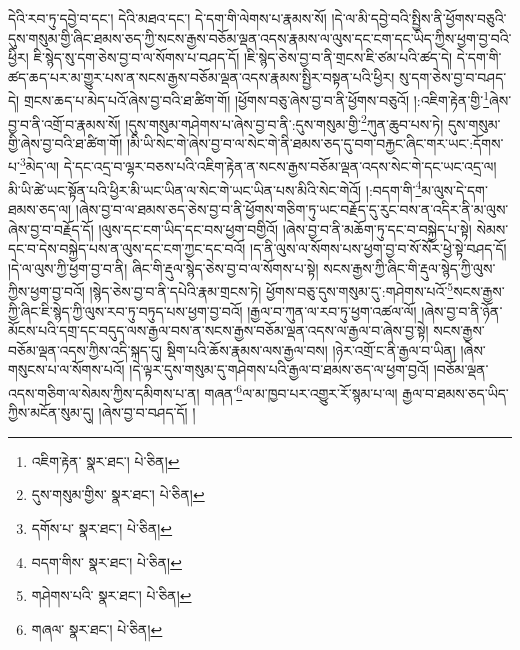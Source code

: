 དེའི་རབ་ཏུ་དབྱེ་བ་དང་། དེའི་མཐའ་དང་། དེ་དག་གི་ལེགས་པ་རྣམས་སོ། །དེ་ལ་མི་དབྱེ་བའི་སྤྱིས་ནི་ཕྱོགས་བཅུའི་དུས་གསུམ་གྱི་ཞིང་ཐམས་ཅད་ཀྱི་སངས་རྒྱས་བཅོམ་ལྡན་འདས་རྣམས་ལ་ལུས་དང་ངག་དང་ཡིད་ཀྱིས་ཕྱག་བྱ་བའི་ཕྱིར། ཇི་སྙེད་སུ་དག་ཅེས་བྱ་བ་ལ་སོགས་པ་བཤད་དོ། །ཇི་སྙེད་ཅེས་བྱ་བ་ནི་གྲངས་ཇི་ཙམ་པའི་ཚད་དེ། དེ་དག་གི་ཚད་ཆད་པར་མ་གྱུར་པས་ན་སངས་རྒྱས་བཅོམ་ལྡན་འདས་རྣམས་སྤྱིར་བསྟན་པའི་ཕྱིར། སུ་དག་ཅེས་བྱ་བ་བཤད་དེ། གྲངས་ཆད་པ་མེད་པའོ་ཞེས་བྱ་བའི་ཐ་ཚིག་གོ། །ཕྱོགས་བཅུ་ཞེས་བྱ་བ་ནི་ཕྱོགས་བཅུའོ། །:འཇིག་རྟེན་གྱི་\footnote{འཇིག་རྟེན་  སྣར་ཐང་།  པེ་ཅིན། }ཞེས་བྱ་བ་ནི་འགྲོ་བ་རྣམས་སོ། །དུས་གསུམ་གཤེགས་པ་ཞེས་བྱ་བ་ནི་:དུས་གསུམ་གྱི་\footnote{དུས་གསུམ་གྱིས་  སྣར་ཐང་།  པེ་ཅིན། }ཀུན་ཆུབ་པས་ཏེ། དུས་གསུམ་གྱི་ཞེས་བྱ་བའི་ཐ་ཚིག་གོ། །མི་ཡི་སེང་གེ་ཞེས་བྱ་བ་ལ་སེང་གེ་ནི་ཐམས་ཅད་དུ་བག་བརྐྱང་ཞིང་གར་ཡང་:དོགས་པ་\footnote{དགོས་པ་  སྣར་ཐང་།  པེ་ཅིན། }མེད་ལ། དེ་དང་འདྲ་བ་ལྷར་བཅས་པའི་འཇིག་རྟེན་ན་སངས་རྒྱས་བཅོམ་ལྡན་འདས་སེང་གེ་དང་ཡང་འདྲ་ལ། མི་ཡི་ཚེ་ཡང་སྟོན་པའི་ཕྱིར་མི་ཡང་ཡིན་ལ་སེང་གེ་ཡང་ཡིན་པས་མིའི་སེང་གེའོ། །:བདག་གི་\footnote{བདག་གིས་  སྣར་ཐང་།  པེ་ཅིན། }མ་ལུས་དེ་དག་ཐམས་ཅད་ལ། །ཞེས་བྱ་བ་ལ་ཐམས་ཅད་ཅེས་བྱ་བ་ནི་ཕྱོགས་གཅིག་ཏུ་ཡང་བརྗོད་དུ་རུང་བས་ན་འདིར་ནི་མ་ལུས་ཞེས་བྱ་བ་བརྗོད་དོ། །ལུས་དང་ངག་ཡིད་དང་བས་ཕྱག་བགྱིའོ། །ཞེས་བྱ་བ་ནི་མཆོག་ཏུ་དང་བ་བསྐྱེད་པ་སྟེ། སེམས་དང་བ་དེས་བསྐྱེད་པས་ན་ལུས་དང་ངག་ཀྱང་དང་བའོ། །ད་ནི་ལུས་ལ་སོགས་པས་ཕྱག་བྱ་བ་སོ་སོར་ཕྱེ་སྟེ་བཤད་དོ། །དེ་ལ་ལུས་ཀྱི་ཕྱག་བྱ་བ་ནི། ཞིང་གི་རྡུལ་སྙེད་ཅེས་བྱ་བ་ལ་སོགས་པ་སྟེ། སངས་རྒྱས་ཀྱི་ཞིང་གི་རྡུལ་སྙེད་ཀྱི་ལུས་ཀྱིས་ཕྱག་བྱ་བའོ། །སྙེད་ཅེས་བྱ་བ་ནི་དཔེའི་རྣམ་གྲངས་ཏེ། ཕྱོགས་བཅུ་དུས་གསུམ་དུ་:གཤེགས་པའོ་\footnote{གཤེགས་པའི་  སྣར་ཐང་།  པེ་ཅིན། }སངས་རྒྱས་ཀྱི་ཞིང་ཇི་སྙེད་ཀྱི་ལུས་རབ་ཏུ་བཏུད་པས་ཕྱག་བྱ་བའོ། །རྒྱལ་བ་ཀུན་ལ་རབ་ཏུ་ཕྱག་འཚལ་ལོ། །ཞེས་བྱ་བ་ནི་ཉོན་མོངས་པའི་དགྲ་དང་བདུད་ལས་རྒྱལ་བས་ན་སངས་རྒྱས་བཅོམ་ལྡན་འདས་ལ་རྒྱལ་བ་ཞེས་བྱ་སྟེ། སངས་རྒྱས་བཅོམ་ལྡན་འདས་ཀྱིས་འདི་སྐད་དུ། སྡིག་པའི་ཆོས་རྣམས་ལས་རྒྱལ་བས། །ཉེར་འགྲོ་ང་ནི་རྒྱལ་བ་ཡིན། །ཞེས་གསུངས་པ་ལ་སོགས་པའོ། །དེ་ལྟར་དུས་གསུམ་དུ་གཤེགས་པའི་རྒྱལ་བ་ཐམས་ཅད་ལ་ཕྱག་བྱའོ། །བཅོམ་ལྡན་འདས་གཅིག་ལ་སེམས་ཀྱིས་དམིགས་པ་ན། གཞན་\footnote{གཞལ་  སྣར་ཐང་།  པེ་ཅིན། }ལ་མ་ཁྱབ་པར་འགྱུར་རོ་སྙམ་པ་ལ། རྒྱལ་བ་ཐམས་ཅད་ཡིད་ཀྱིས་མངོན་སུམ་དུ། །ཞེས་བྱ་བ་བཤད་དོ། །
